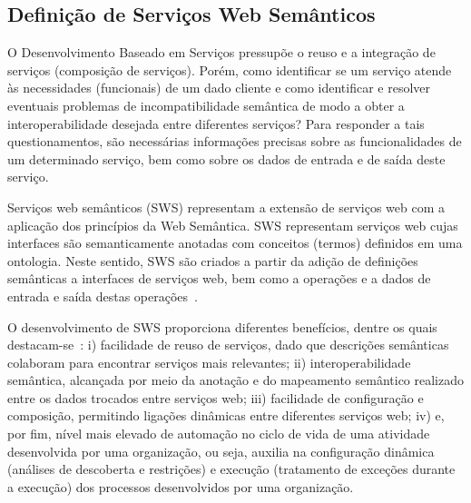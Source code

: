 \subsection{Definição de Serviços Web Semânticos}\label{2-fundamentacao-sws-definicao}

O Desenvolvimento Baseado em Serviços pressupõe o reuso e a integração de serviços (composição de serviços). Porém, como identificar se um serviço atende às necessidades (funcionais) de um dado cliente e como identificar e resolver eventuais problemas de incompatibilidade semântica de modo a obter a interoperabilidade desejada entre diferentes serviços? Para responder a tais questionamentos, são necessárias informações precisas sobre as funcionalidades de um determinado serviço, bem como sobre os dados de entrada e de saída deste serviço.

Serviços web semânticos (SWS) representam a extensão de serviços web com a aplicação dos princípios da Web Semântica. SWS representam serviços web cujas interfaces são semanticamente anotadas com conceitos (termos) definidos em uma ontologia. Neste sentido, SWS são criados a partir da adição de definições semânticas a interfaces de serviços web, bem como a operações e a dados de entrada e saída destas operações~\cite{CARDOSO-2006-Semantic-Web-Services, W3C-2007-SAWSDL, STAVROPOULOS-2013-Iridescent}.

O desenvolvimento de SWS proporciona diferentes benefícios, dentre os quais destacam-se~\cite{SHETH-2007-SAWSDL-Tools}: i) facilidade de reuso de serviços, dado que descrições semânticas colaboram para encontrar serviços mais relevantes; ii) interoperabilidade semântica, alcançada por meio da anotação e do mapeamento semântico realizado entre os dados trocados entre serviços web; iii) facilidade de configuração e composição, permitindo ligações dinâmicas entre diferentes serviços web; iv) e, por fim, nível mais elevado de automação no ciclo de vida de uma atividade desenvolvida por uma organização, ou seja, auxilia na configuração dinâmica (análises de descoberta e restrições) e execução (tratamento de exceções durante a execução) dos processos desenvolvidos por uma organização.